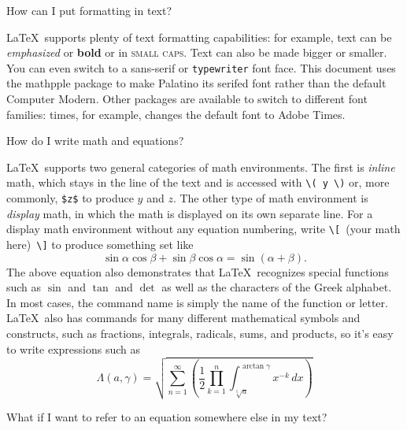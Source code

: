 \documentclass[12pt,letterpaper,noheader]{hmcpset}
\newcommand{\pkg}[1]{\textsf{#1}}
\begin{document}

\begin{problem}
How can I put formatting in text?
\end{problem}

\begin{solution}
\LaTeX\ supports plenty of text formatting capabilities: for example, text can be \emph{emphasized} or \textbf{bold} or in \textsc{small caps}. Text can also be made {\large bigger} or {\small smaller}. You can even switch to a \textsf{sans-serif} or \texttt{typewriter} font face. This document uses the \pkg{mathpple} package to make Palatino its serifed font rather than the default Computer Modern. Other packages are available to switch to different font families: \pkg{times}, for example, changes the default font to Adobe Times.
\end{solution}

\begin{problem}
How do I write math and equations?
\end{problem}

\begin{solution}
\LaTeX\ supports two general categories of math environments. The first is \emph{inline} math, which stays in the line of the text and is accessed with
\verb#\( y \)# or, more commonly, \verb#$z$# to produce \( y \) and $z$. The other type of math environment is \emph{display} math, in which the math is displayed on its own separate line. For a display math environment without any equation numbering, write \verb#\[ #(your math here)\verb# \]# to produce something set like
\[
  \sin \alpha \cos \beta + \sin \beta \cos \alpha = \sin (\alpha + \beta).
\]
The above equation also demonstrates that \LaTeX\ recognizes special functions such as $\sin$ and $\tan$ and $\det$ as well as the characters of the Greek alphabet. In most cases, the command name is simply the name of the function or letter. \LaTeX\ also has commands for many different mathematical symbols and constructs, such as fractions, integrals, radicals, sums, and products, so it's easy to write expressions such as
\[
  \Lambda(a, \gamma) = \sqrt{\sum_{n = 1}^\infty \left (\frac{1}{2} \prod_{k = 1}^n \int_{\sqrt[5]{a}}^{\arctan \gamma} x^{-k} \, dx \right)}
\]
\end{solution}

\begin{problem}
What if I want to refer to an equation somewhere else in my text?
\end{problem}
\end{document}
